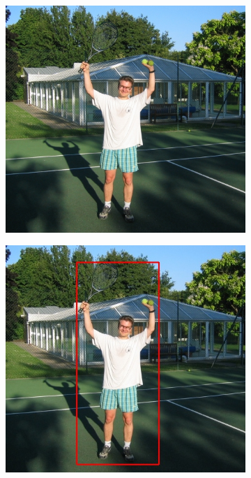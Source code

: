 \documentclass[a4paper,11]{article}
\begin{document}
\begin{center}
\begin{figure}[H]
   \begin{subfigure}{0.33\textwidth}
      \centering
      \includegraphics[width=0.9\linewidth]{images/tennis}
    \end{subfigure}
    \begin{subfigure}{.33\textwidth}
      \centering
      \includegraphics[width=0.9\linewidth]{results/input/tennis}
    \end{subfigure}
    \begin{subfigure}{0.33\textwidth}

\end{subfigure}
\end{figure}
\end{center}
\end{document}
